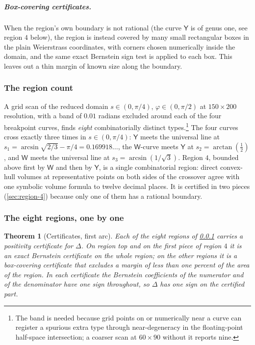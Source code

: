 \documentclass[11pt,reqno]{amsart}
\renewcommand{\_}{\origunderscore\allowbreak}
\numberwithin{equation}{section}
\theoremstyle{plain}
\newtheorem{thm}{Theorem}[section]
\theoremstyle{definition}
\theoremstyle{remark}
\newcommand{\tilt}{\varphi}                  %
\newcommand{\arcp}{s}                        %
\newcommand{\defect}{\Delta}                 %
\begin{document}
\subparagraph{Box-covering certificates.} When the region's own boundary is
not rational (the curve $\mathsf Y$ is of genus one, see region $4$
below), the region is instead covered by many small
rectangular boxes in the plain Weierstrass coordinates, with corners
chosen numerically inside the domain, and the same exact Bernstein sign
test is applied to each box. This leaves out a thin margin of known size
along the boundary.

\subsubsection{The region count}\label{sec:region-count-correction}

A grid scan of the reduced domain $\arcp\in(0,\pi/4)$,
$\tilt\in(0,\pi/2)$ at $150\times200$ resolution, with a band of
$0.01$ radians excluded around each of the four breakpoint curves,
finds \emph{eight} combinatorially distinct types.\footnote{The band is
needed because grid points on or numerically near a curve can register a
spurious extra type through near-degeneracy in the floating-point
half-space intersection; a coarser scan at $60\times90$ without it
reports nine.} The four curves cross exactly three times in
$\arcp\in(0,\pi/4)$: $\mathsf Y$ meets the universal line at
$\arcp_1=\arcsin\sqrt{2/3}-\pi/4=0.169918\ldots$, the $\mathsf W$-curve meets $\mathsf Y$ at
$\arcp_2=\arctan(\tfrac12)$, and $\mathsf W$ meets the universal line
at $\arcp_3=\arcsin(1/\sqrt3)$. Region $4$, bounded above first by
$\mathsf W$ and then by $\mathsf Y$, is a single combinatorial region:
direct convex-hull volumes at representative points on both sides of
the crossover agree with one symbolic volume formula to twelve decimal
places. It is certified in two pieces (\cref{sec:region-4}) because
only one of them has a rational boundary.

\subsubsection{The eight regions, one by one}

\begin{thm}[Certificates, first arc]\label{thm:arc1-certs-new}
Each of the eight regions of \cref{sec:region-count-correction}
carries a positivity certificate for $\defect$. On region top and on
the first piece of region $4$ it is an exact Bernstein certificate on
the whole region; on the other regions it is a box-covering certificate
that excludes a margin of less than one percent of the area of the
region. In each certificate the Bernstein coefficients of the numerator
and of the denominator have one sign throughout, so $\defect$ has one
sign on the certified part.
\end{thm}
\end{document}

